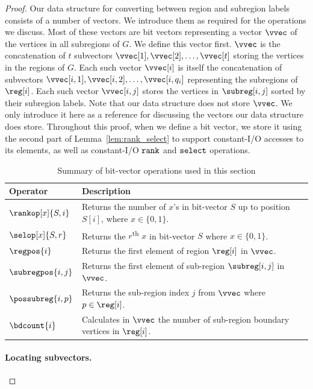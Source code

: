 {\begin{proof}
  Our data structure for converting between region and subregion labels consists
  of a number of vectors.
  We introduce them as required for the operations we discuss.
  Most of these vectors are bit vectors representing a vector $\vvec$
  of the vertices in all subregions of $G$.
  We define this vector first.
  $\vvec$ is the concatenation of $t$ subvectors $\vvec[1], \vvec[2],
  \dots, \vvec[t]$ storing the vertices in the regions of $G$.
  Each such vector $\vvec[i]$ is itself the concatenation of
  subvectors $\vvec[i,1], \vvec[i,2], \dots, \vvec[i,q_i]$ representing
  the subregions of $\reg[i]$.
  Each such vector $\vvec[i,j]$ stores the vertices in $\subreg[i,j]$
  sorted by their subregion labels.
  Note that our data structure does not store $\vvec$.
  We only introduce it here as a reference for discussing the vectors our
  data structure does store.
  Throughout this proof, when we define a bit vector, we store it using
  the second part of Lemma~\ref{lem:rank_select} to support constant-I/O
  accesses to its elements, as well as constant-I/O $\texttt{rank}$ and $\texttt{select}$
  operations.

\begin{table}[ht]
	\centering
		\begin{tabular}{ l | l}
			Operator & Description \\ \hline
			$\rankop[x]{S, i}$ & Returns the number of $x$'s in bit-vector $S$ up to
				position $S[i]$, where $x \in \{0,1\}$.\\
			$\selop[x]{S, r}$ & Returns the $r$\textsuperscript{th} $x$ in bit-vector $S$
				where $x \in \{0,1\}$.\\
			$\regpos{i}$ & Returns the first element of region $\reg[i]$ in $\vvec$. \\
			$\subregpos{i,j}$ & Returns the first element of sub-region $\subreg[i,j]$
				in $\vvec$. \\
			$\possubreg{i,p}$ & Returns the sub-region index $j$ from $\vvec$ where
				$p \in \reg[i]$. \\
			$\bdcount{i}$ & Calculates in $\vvec$ the number of sub-region boundary vertices
				in $\reg[i]$. \\ \hline
		\end{tabular}
	\caption{Summary of bit-vector operations used in this section }
	\label{tab:succ_operators}
\end{table}

  \paragraph{Locating subvectors.}


\end{proof}}
